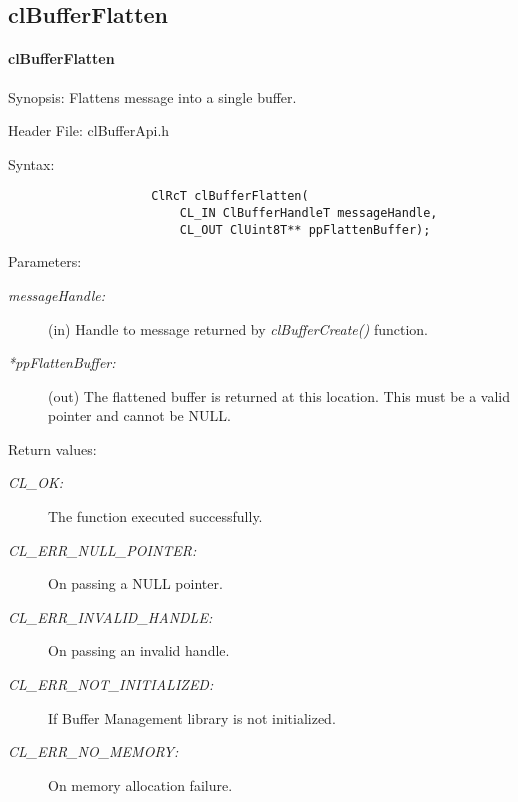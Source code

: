 \subsection{clBufferFlatten}
\hypertarget{pagebuf131}{}\paragraph{cl\-Buffer\-Flatten}\label{pagebuf131}
\begin{Desc}
\item[Synopsis:]Flattens message into a single buffer.\end{Desc}
\begin{Desc}
\item[Header File:]clBufferApi.h\end{Desc}
\begin{Desc}
\item[Syntax:]

\footnotesize\begin{verbatim}   
					ClRcT clBufferFlatten(
						CL_IN ClBufferHandleT messageHandle,
						CL_OUT ClUint8T** ppFlattenBuffer);
\end{verbatim}
\normalsize
\end{Desc}
\begin{Desc}
\item[Parameters:]
\begin{description}
\item[{\em message\-Handle:}](in) Handle to message returned by \textit{clBufferCreate()} function. 
\item[{\em **pp\-Flatten\-Buffer:}](out) The flattened buffer is returned at this location. This must be a valid pointer and cannot be NULL.\end{description}
\end{Desc}
\begin{Desc}
\item[Return values:]
\begin{description}
\item[{\em CL\_\-OK:}]The function executed successfully. 
\item[{\em CL\_\-ERR\_\-NULL\_\-POINTER:}]On passing a NULL pointer. 
\item[{\em CL\_\-ERR\_\-INVALID\_\-HANDLE:}]On passing an invalid handle. 
\item[{\em CL\_\-ERR\_\-NOT\_\-INITIALIZED:}]If Buffer Management library is not initialized. 
\item[{\em CL\_\-ERR\_\-NO\_\-MEMORY:}]On memory allocation failure.\end{description}
\end{Desc}
